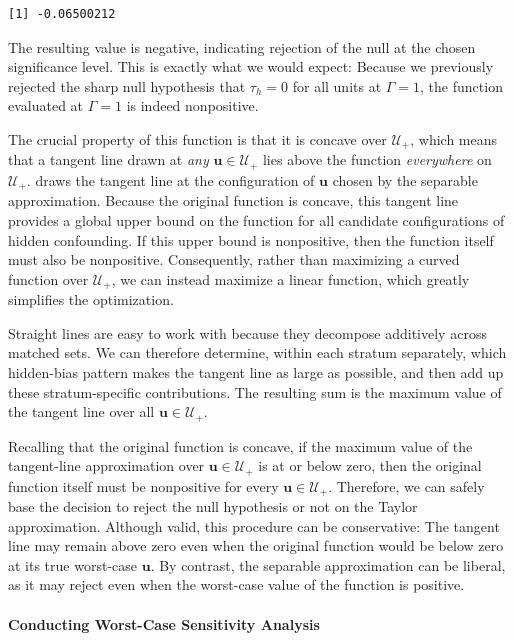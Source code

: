 \documentclass[
  12pt,
  leqno]{article}
\begin{document}
\begin{verbatim}
[1] -0.06500212
\end{verbatim}

\doublespacing

The resulting value is negative, indicating rejection of the null at the
chosen significance level. This is exactly what we would expect: Because
we previously rejected the sharp null hypothesis that \(\tau_h = 0\) for
all units at \(\Gamma = 1\), the function evaluated at \(\Gamma = 1\) is
indeed nonpositive.

The crucial property of this function is that it is concave over
\(\mathcal{U}_{+}\), which means that a tangent line drawn at \emph{any}
\(\bm{u} \in \mathcal{U}_+\) lies above the function \emph{everywhere}
on \(\mathcal{U}_{+}\). \citet{rosenbaum2018} draws the tangent line at
the configuration of \(\bm{u}\) chosen by the separable approximation.
Because the original function is concave, this tangent line provides a
global upper bound on the function for all candidate configurations of
hidden confounding. If this upper bound is nonpositive, then the
function itself must also be nonpositive. Consequently, rather than
maximizing a curved function over \(\mathcal{U}_{+}\), we can instead
maximize a linear function, which greatly simplifies the optimization.

Straight lines are easy to work with because they decompose additively
across matched sets. We can therefore determine, within each stratum
separately, which hidden-bias pattern makes the tangent line as large as
possible, and then add up these stratum-specific contributions. The
resulting sum is the maximum value of the tangent line over all
\(\bm{u} \in \mathcal{U}_{+}\).

Recalling that the original function is concave, if the maximum value of
the tangent-line approximation over \(\bm{u} \in \mathcal{U}_{+}\) is at
or below zero, then the original function itself must be nonpositive for
every \(\bm{u} \in \mathcal{U}_{+}\). Therefore, we can safely base the
decision to reject the null hypothesis or not on the Taylor
approximation. Although valid, this procedure can be conservative: The
tangent line may remain above zero even when the original function would
be below zero at its true worst-case \(\bm{u}\). By contrast, the
separable approximation can be liberal, as it may reject even when the
worst-case value of the function is positive.

\paragraph{Conducting Worst-Case Sensitivity
Analysis}\label{conducting-worst-case-sensitivity-analysis}
\end{document}
